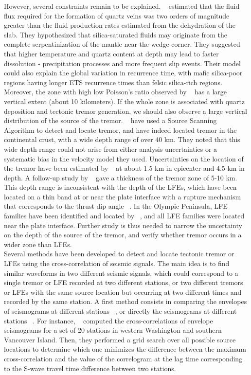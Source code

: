 \documentclass[draft]{agujournal2019}
\begin{document}
However, several constraints remain to be explained. ~ estimated that the fluid flux required for the formation of quartz veins was two orders of magnitude greater than the fluid production rates estimated from the dehydration of the slab. They hypothesized that silica-saturated fluids may originate from the complete serpentinization of the mantle near the wedge corner. They suggested that higher temperature and quartz content at depth may lead to faster dissolution - precipitation processes and more frequent slip events. Their model could also explain the global variation in recurrence time, with mafic silica-poor regions having longer ETS recurrence times than felsic silica-rich regions. \\

Moreover, the zone with high low Poisson's ratio observed by ~ has a large vertical extent (about 10 kilometers). If the whole zone is associated with quartz deposition and tectonic tremor generation, we should also observe a large vertical distribution of the source of the tremor. ~ have used a Source Scanning Algorithm to detect and locate tremor, and have indeed located tremor in the continental crust, with a wide depth range of over 40 km. They noted that this wide depth range could not arise from either analysis uncertainties or a systematic bias in the velocity model they used. Uncertainties on the location of the tremor have been estimated by  ~ at about 1.5 km in epicenter and 4.5 km in depth. A follow-up study by ~ gave a thickness of the tremor zone of 5-10 km. This depth range is inconsistent with the depth of the LFEs, which have been located on a thin band at or near the plate interface with a rupture mechanism that corresponds to the thrust dip angle ~\cite{IDE_2007_GRL}. In the Olympic Peninsula, LFE families have been identified and located by ~, and all LFE families were located near the plate interface. Further study is thus needed to narrow the uncertainty on the depth of the source of the tremor, and verify whether tremor occurs in a wider zone than LFEs. \\

Several methods have been developed to detect and locate tectonic tremor or LFEs using the cross-correlation of seismic signals. The main idea is to find similar waveforms in two different seismic signals, which could correspond to a single tremor or LFE recorded at two different stations, or two different tremors or LFEs with the same source location but occurring at two different times and recorded by the same station. A first method consists in comparing the envelopes of seismograms at different stations ~\cite{OBA_2002, WEC_2008}, or directly the seismograms at different stations ~\cite{RUB_2013}. For instance, ~ computed the cross-correlations of envelope seismograms for a set of 20 stations in western Washington and southern Vancouver Island. Then, they performed a grid search over all possible source locations to determine which one minimizes the difference between the maximum cross-correlation and the value of the correlogram at the lag time corresponding to the S-wave travel time difference between two stations. \\
\end{document}
